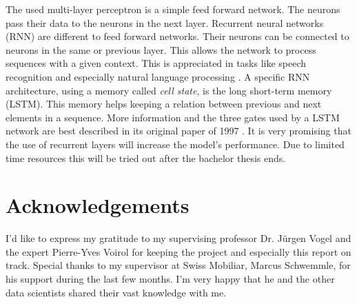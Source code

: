 The used multi-layer perceptron is a simple feed forward network. The neurons pass their data to the neurons in the next layer. Recurrent neural networks (RNN) are different to feed forward networks. Their neurons can be connected to neurons in the same or previous layer. This allows the network to process sequences with a given context. This is appreciated in tasks like speech recognition and especially natural language processing \cite{wiki07}. A specific RNN architecture, using a memory called \emph{cell state}, is the long short-term memory (LSTM). This memory helps keeping a relation between previous and next elements in a sequence. More information and the three gates used by a LSTM network are best described in its original paper of 1997 \cite{lstm97}. It is very promising that the use of recurrent layers will increase the model's performance. Due to limited time resources this will be tried out after the bachelor thesis ends.

\newpage

\section{Acknowledgements}

I'd like to express my gratitude to my supervising professor Dr. Jürgen Vogel and the expert Pierre-Yves Voirol for keeping the project and especially this report on track. Special thanks to my supervisor at Swiss Mobiliar, Marcus Schwemmle, for his support during the last few months. I'm very happy that he and the other data scientists shared their vast knowledge with me.
